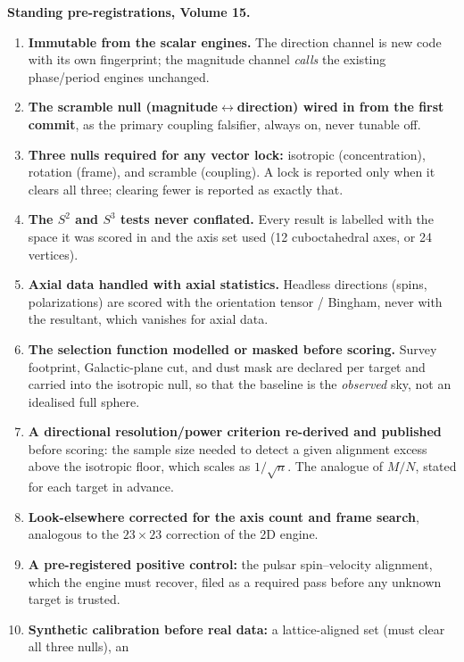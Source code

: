 \documentclass[11pt, letterpaper, openany]{book}
\begin{document}
\begin{predictionbox}
\textbf{Standing pre-registrations, Volume 15.}
\begin{enumerate}
    \item \textbf{Immutable from the scalar engines.} The direction channel is new code with its own
          fingerprint; the magnitude channel \emph{calls} the existing phase/period engines unchanged.
    \item \textbf{The scramble null (magnitude$\leftrightarrow$direction) wired in from the first commit}, as
          the primary coupling falsifier, always on, never tunable off.
    \item \textbf{Three nulls required for any vector lock:} isotropic (concentration), rotation (frame),
          and scramble (coupling). A lock is reported only when it clears all three; clearing fewer is reported
          as exactly that.
    \item \textbf{The $S^2$ and $S^3$ tests never conflated.} Every result is labelled with the space it was
          scored in and the axis set used (12 cuboctahedral axes, or 24 vertices).
    \item \textbf{Axial data handled with axial statistics.} Headless directions (spins, polarizations) are
          scored with the orientation tensor / Bingham, never with the resultant, which vanishes for axial data.
    \item \textbf{The selection function modelled or masked before scoring.} Survey footprint, Galactic-plane
          cut, and dust mask are declared per target and carried into the isotropic null, so that the baseline
          is the \emph{observed} sky, not an idealised full sphere.
    \item \textbf{A directional resolution/power criterion re-derived and published} before scoring: the sample
          size needed to detect a given alignment excess above the isotropic floor, which scales as $1/\sqrt{n}$.
          The analogue of $M/N$, stated for each target in advance.
    \item \textbf{Look-elsewhere corrected for the axis count and frame search}, analogous to the $23\times23$
          correction of the 2D engine.
    \item \textbf{A pre-registered positive control:} the pulsar spin--velocity alignment, which the engine must
          recover, filed as a required pass before any unknown target is trusted.
    \item \textbf{Synthetic calibration before real data:} a lattice-aligned set (must clear all three nulls), an

\end{enumerate}
\end{predictionbox}
\end{document}

